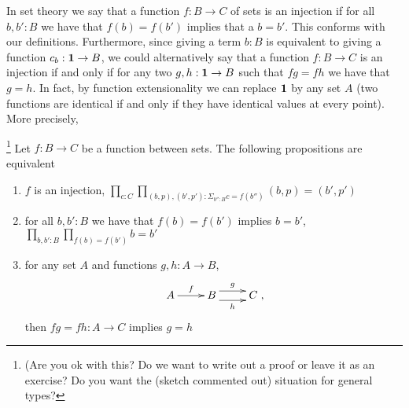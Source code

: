In set theory we say that a function $f:B\to C$ of sets is an injection if for all $b,b':B$ we have that $f(b)=f(b')$ implies that a $b=b'$.  This conforms with our definitions.
Furthermore, since giving a term $b:B$ is equivalent to giving a function $c_b:\mathbf{1}\to B$, we could alternatively say that a function $f:B\to C$ is an injection if and only if for any two $g,h:\mathbf{1}\to B$ such that $fg=fh$ we have that $g=h$.  In fact, by function extensionality we can replace $\mathbf{1}$ by any set $A$ (two functions are identical if and only if they have identical values at every point).  More precisely,
\begin{lemma}\footnote{(Are you ok with this?  Do we want to write out a proof or leave it as an exercise?  Do you want the (sketch commented out) situation for general types?}
  \label{lem:injofsetsaremono}Let $f:B\to C$ be a function between sets.
  The following propositions are equivalent
  \begin{enumerate}
  \item $f$ is an injection, \ie $\prod_{c:C}\prod_{(b,p),(b',p'):\Sigma_{b'':B}c=f(b'')}(b,p)=(b',p')$
  \item for all $b,b':B$ we have that $f(b)=f(b')$ implies $b=b'$, \ie $\prod_{b,b':B}{\prod_{f(b)=f(b')}b=b'}$
  \item for any set $A$ and functions $g,h:A\to B$, 
$$\xymatrix{A\ar[r]^f&B\ar@<1ex>[r]^g\ar@<-1ex>[r]_h&C},$$  then $fg=fh:A\to C$ implies $g=h$
  \end{enumerate}
\end{lemma}
